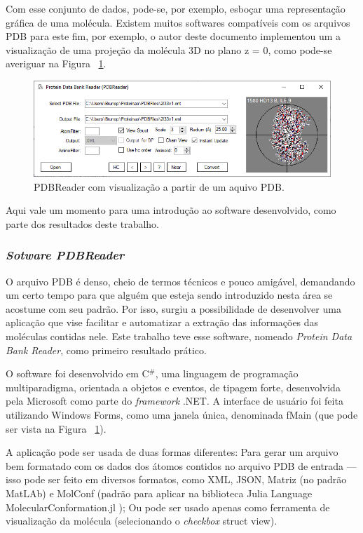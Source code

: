 \documentclass[a4paper,12pt]{article}
\begin{document}
	Com esse conjunto de dados, pode-se, por exemplo, esboçar uma representação gráfica de uma molécula. Existem muitos softwares compatíveis com os arquivos PDB para este fim, por exemplo, o autor deste documento implementou um a visualização de uma projeção da molécula 3D no plano z = 0, como pode-se averiguar na Figura ~\ref{fig:molproj}.
	
	\begin{figure}[H]
		\begin{center}
			\includegraphics[width=1\linewidth]{molproj.png}
		\end{center}
		\caption{PDBReader com visualização a partir de um aquivo PDB.}
		\label{fig:molproj}
	\end{figure}
	
	
	Aqui vale um momento para uma introdução ao software desenvolvido, como parte dos resultados deste trabalho. 
	\subsubsection{\textit{Sotware PDBReader}}
	O arquivo PDB é denso, cheio de termos técnicos e pouco amigável, demandando um certo tempo para que alguém que esteja sendo introduzido nesta área se acostume com seu padrão. Por isso, surgiu a possibilidade de desenvolver uma aplicação que vise facilitar e automatizar a extração das informações das moléculas contidas nele. Este trabalho teve esse software, nomeado \textit{Protein Data Bank Reader}, como primeiro resultado prático.
	
	O software foi desenvolvido em C${^\#}$, uma linguagem de programação multiparadigma, orientada a objetos e eventos, de tipagem forte, desenvolvida pela Microsoft como parte do \textit{framework }.NET. A interface de usuário foi feita utilizando Windows Forms, como uma janela única, denominada fMain (que pode ser vista na Figura ~\ref{fig:molproj}).
	
	A aplicação pode ser usada de duas formas diferentes: Para gerar um arquivo bem formatado com os dados dos átomos contidos no arquivo PDB de entrada --- isso pode ser feito em diversos formatos, como XML, JSON, Matriz (no padrão MatLAb) e MolConf (padrão para aplicar na biblioteca Julia Language MolecularConformation.jl \cite{emersonMolConf}); Ou pode ser usado apenas como ferramenta de visualização da molécula (selecionando o \textit{checkbox} struct view).
	
\end{document}
